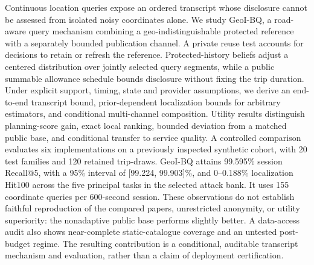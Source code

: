 Continuous location queries expose an ordered transcript whose disclosure cannot be assessed
from isolated noisy coordinates alone. We study GeoI-BQ, a road-aware query mechanism combining
a geo-indistinguishable protected reference with a separately bounded publication channel.
A private reuse test accounts for decisions to retain or refresh the reference. Protected-history
beliefs adjust a centered distribution over jointly selected query segments, while a public
summable allowance schedule bounds disclosure without fixing the trip duration. Under explicit
support, timing, state and provider assumptions, we derive an end-to-end transcript bound,
prior-dependent localization bounds for arbitrary estimators, and conditional multi-channel
composition. Utility results distinguish planning-score gain, exact local ranking, bounded
deviation from a matched public base, and conditional transfer to service quality.
A controlled comparison evaluates six implementations on a previously inspected synthetic
cohort, with 20 test families and 120 retained trip-draws. GeoI-BQ attains 99.595\% session
Recall@5, with a 95\% interval of [99.224, 99.903]\%, and 0--0.188\% localization Hit100
across the five principal tasks in the selected attack bank. It uses 155 coordinate queries
per 600-second session. These observations do not establish faithful reproduction of the
compared papers, unrestricted anonymity, or utility superiority: the nonadaptive public base
performs slightly better. A data-access audit also shows near-complete static-catalogue
coverage and an untested post-budget regime. The resulting contribution is a conditional,
auditable transcript mechanism and evaluation, rather than a claim of deployment certification.
